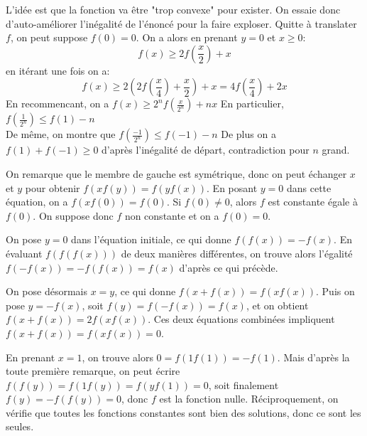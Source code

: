\begin{sol}
L'idée est que la fonction va être "trop convexe" pour exister. On essaie donc d'auto-améliorer l'inégalité de l'énoncé pour la faire exploser.
Quitte à translater $f$, on peut suppose $f(0)=0$. On a alors en prenant $y=0$ et $x\ge 0$:
$$f(x)\ge 2f\left(\frac{x}{2}\right)+x$$
en itérant une fois on a:
$$f(x)\ge 2\left(2f\left(\frac{x}{4}\right)+\frac{x}{2}\right)+x=4f\left(\frac{x}{4}\right)+2x$$
En recommencant, on a $f(x)\ge 2^n f\left(\displaystyle\frac{x}{2^n}\right)+nx$
En particulier, $f\left(\displaystyle\frac{1}{2^n}\right)\le f(1)-n$\\
De même, on montre que $f\left(\displaystyle\frac{-1}{2^n}\right)\le f(-1)-n$
De plus on a $f(1)+f(-1)\ge 0$ d'après l'inégalité de départ, contradiction pour $n$ grand.
\end{sol}


\begin{sol}
On remarque que le membre de gauche est symétrique, donc on peut échanger $x$ et $y$ pour obtenir $f(xf(y))=f(yf(x))$. En posant $y=0$ dans cette équation, on a $f(xf(0))=f(0)$. Si $f(0)\ne 0$, alors $f$ est constante égale à $f(0)$. On suppose donc $f$ non constante et on a $f(0)=0$.

On pose $y=0$ dans l'équation initiale, ce qui donne $f(f(x))=-f(x)$. En évaluant $f(f(f(x)))$ de deux manières différentes, on trouve alors l'égalité $f(-f(x))=-f(f(x))=f(x)$ d'après ce qui précède.

On pose désormais $x=y$, ce qui donne $f(x+f(x))=f(xf(x))$. Puis on pose $y=-f(x)$, soit $f(y)=f(-f(x))=f(x)$, et on obtient $f(x+f(x))=2f(xf(x))$. Ces deux équations combinées impliquent $f(x+f(x))=f(xf(x))=0$.

En prenant $x=1$, on trouve alors $0=f(1f(1))=-f(1)$. Mais d'après la toute première remarque, on peut écrire $f(f(y))=f(1f(y))=f(yf(1))=0$, soit finalement $f(y)=-f(f(y))=0$, donc $f$ est la fonction nulle. Réciproquement, on vérifie que toutes les fonctions constantes sont bien des solutions, donc ce sont les seules.
\end{sol}


